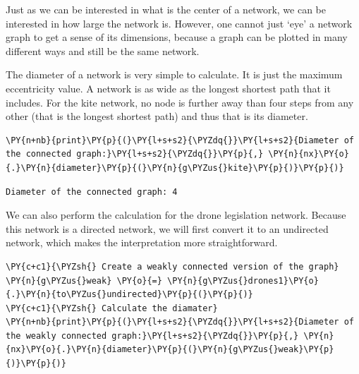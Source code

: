 Just as we can be interested in what is the center of a network, we can
be interested in how large the network is. However, one cannot just
`eye' a network graph to get a sense of its dimensions, because a graph
can be plotted in many different ways and still be the same network.

The diameter of a network is very simple to calculate. It is just the
maximum eccentricity value. A network is as wide as the longest shortest
path that it includes. For the kite network, no node is further away
than four steps from any other (that is the longest shortest path) and
thus that is its diameter.

    \begin{tcolorbox}[breakable, size=fbox, boxrule=1pt, pad at break*=1mm,colback=cellbackground, colframe=cellborder]
\begin{Verbatim}[commandchars=\\\{\}]
\PY{n+nb}{print}\PY{p}{(}\PY{l+s+s2}{\PYZdq{}}\PY{l+s+s2}{Diameter of the connected graph:}\PY{l+s+s2}{\PYZdq{}}\PY{p}{,} \PY{n}{nx}\PY{o}{.}\PY{n}{diameter}\PY{p}{(}\PY{n}{g\PYZus{}kite}\PY{p}{)}\PY{p}{)}
\end{Verbatim}
\end{tcolorbox}

    \begin{Verbatim}[commandchars=\\\{\}]
Diameter of the connected graph: 4
    \end{Verbatim}

    We can also perform the calculation for the drone legislation network.
Because this network is a directed network, we will first convert it to
an undirected network, which makes the interpretation more
straightforward.

    \begin{tcolorbox}[breakable, size=fbox, boxrule=1pt, pad at break*=1mm,colback=cellbackground, colframe=cellborder]
\begin{Verbatim}[commandchars=\\\{\}]
\PY{c+c1}{\PYZsh{} Create a weakly connected version of the graph}
\PY{n}{g\PYZus{}weak} \PY{o}{=} \PY{n}{g\PYZus{}drones1}\PY{o}{.}\PY{n}{to\PYZus{}undirected}\PY{p}{(}\PY{p}{)}
\PY{c+c1}{\PYZsh{} Calculate the diamater}
\PY{n+nb}{print}\PY{p}{(}\PY{l+s+s2}{\PYZdq{}}\PY{l+s+s2}{Diameter of the weakly connected graph:}\PY{l+s+s2}{\PYZdq{}}\PY{p}{,} \PY{n}{nx}\PY{o}{.}\PY{n}{diameter}\PY{p}{(}\PY{n}{g\PYZus{}weak}\PY{p}{)}\PY{p}{)}
\end{Verbatim}
\end{tcolorbox}

